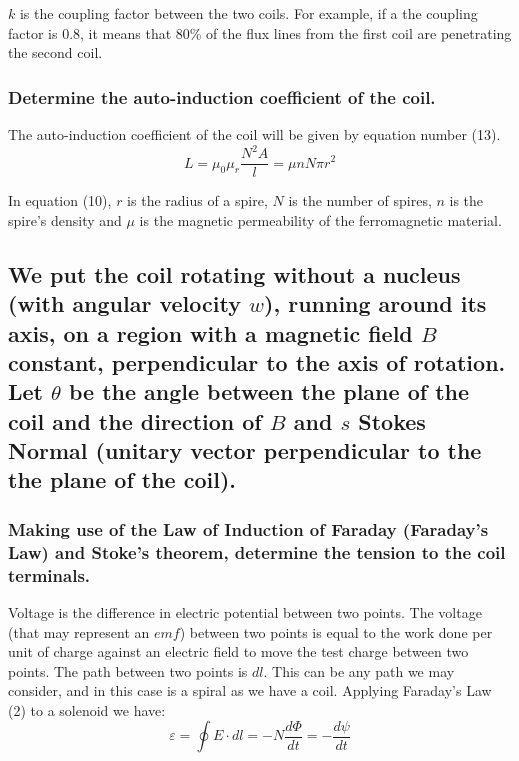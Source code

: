 \documentclass[a4paper,12pt]{article}
\begin{document}
$k$ is the coupling factor between the two coils. For example, if a the coupling factor is 0.8, it means that 80\% of the flux lines from the first coil are penetrating the second coil.

\subsubsection{Determine the auto-induction coefficient of the coil.}

The auto-induction coefficient of the coil will be given by equation number (13). 
\begin{equation}
L = \mu_0 \mu_r\frac{ N^2A}{l} = \mu nN\pi r^2 
\end{equation}

In equation (10), $r$ is the radius of a spire, $N$ is the number of spires, $n$ is the spire's density and $\mu$ is the magnetic permeability of the ferromagnetic material.


\subsection{We put the coil rotating without a nucleus (with angular velocity $w$), running around its axis, on a region with a magnetic field $B$ constant, perpendicular to the axis of rotation. Let $\theta$ be the angle between the plane of the coil and the direction of $B$ and $s$ Stokes Normal (unitary vector perpendicular to the the plane of the coil).  }

\subsubsection{Making use of the Law of Induction of Faraday (Faraday's Law) and Stoke's theorem, determine the tension to the coil terminals.}

\hspace{1cm} Voltage is the difference in electric potential between two points. The voltage (that may represent an $emf$) between two points is equal to the work done per unit of charge against an electric field to move the test charge between two points. The path between two points is $dl$. This can be any path we may consider, and in this case is a spiral as we have a coil. Applying Faraday's Law (2) to a solenoid we have:
\begin{equation}
\varepsilon = \oint E\cdot dl = -N\frac{d\Phi }{dt} = -\frac{d\psi}{dt}
\end{equation}
\end{document}
